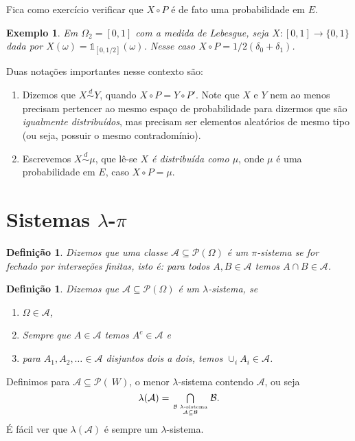 \documentclass[reqno]{article}
\newcommand*\1{\mathds{1}}
\newtheorem{definition}[theorem]{Definição}
\def \distr {\overset{d}{\sim}}
\newtheorem{example}{Exemplo}[section]
\newcommand{\mcap}{\textstyle \bigcap\limits}
\begin{document}
Fica como exercício verificar que $X \circ P$ é de fato uma probabilidade em $E$.

\begin{example}
  Em $\Omega_2 = [0,1]$ com a medida de Lebesgue, seja $X:[0,1] \to \{0,1\}$ dada por $X(\omega) = \1_{[0,1/2]} (\omega)$.
  Nesse caso $X \circ P = 1/2(\delta_0 + \delta_1)$.
\end{example}

Duas notações importantes nesse contexto são:
\begin{enumerate}
\item Dizemos que $X \distr Y$, quando $X \circ P = Y \circ P'$.
Note que $X$ e $Y$ nem ao menos precisam pertencer ao mesmo espaço de probabilidade para dizermos que são \emph{igualmente distribuídos}, mas precisam ser elementos aleatórios de mesmo tipo (ou seja, possuir o mesmo contradomínio).
\item Escrevemos $X \distr \mu$, que lê-se \emph{$X$ é distribuída como $\mu$}, onde $\mu$ é uma probabilidade em $E$, caso $X \circ P = \mu$.
\end{enumerate}

\section{Sistemas $\lambda$-$\pi$}

\begin{definition}
  Dizemos que uma classe $\mathcal{A} \subseteq \mathcal{P}(\Omega)$ é um $\pi$-sistema se for fechado por interseções finitas, isto é: para todos $A, B \in \mathcal{A}$ temos $A \cap B \in \mathcal{A}$.
\end{definition}

\begin{definition}
  Dizemos que $\mathcal{A} \subseteq \mathcal{P}(\Omega)$ é um $\lambda$-sistema, se
  \begin{enumerate}
  \item $\Omega \in \mathcal{A}$,
  \item Sempre que $A \in \mathcal{A}$ temos $A^c \in \mathcal{A}$ e
  \item para $A_1, A_2, \dots \in \mathcal{A}$ disjuntos dois a dois, temos $\cup_i A_i \in \mathcal{A}$.
  \end{enumerate}
\end{definition}

Definimos para $\mathcal{A} \subseteq \mathcal{P}(~W)$, o menor $\lambda$-sistema contendo $\mathcal{A}$, ou seja
\begin{equation}
  \lambda(\mathcal{A}) = \mcap_{\text{$\mathcal{B}$ $\lambda$-sistema} \atop \mathcal{A} \subseteq \mathcal{B}} \mathcal{B}.
\end{equation}
É fácil ver que $\lambda(\mathcal{A})$ é sempre um $\lambda$-sistema.
\end{document}
